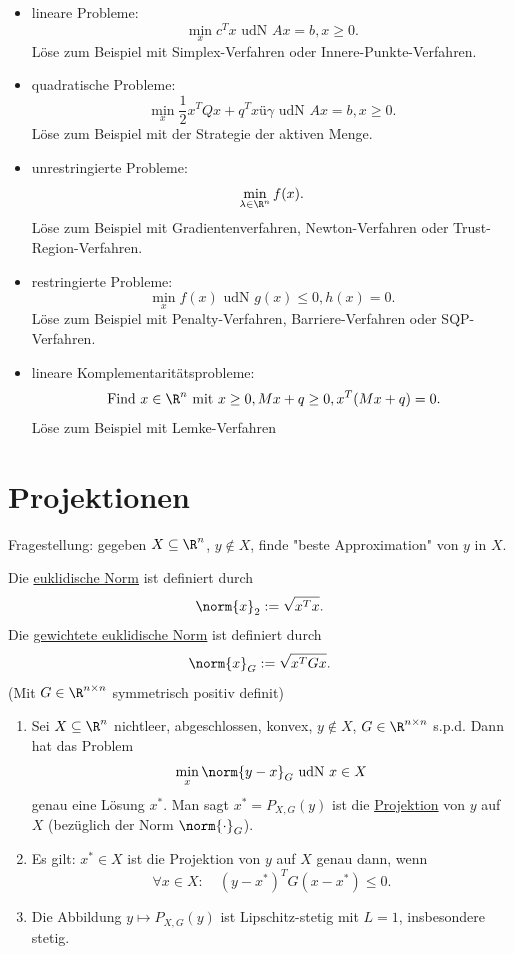\begin{itemize}
	\item lineare Probleme:
		\[
		\min\limits_{x}c^{T}x \text{ udN } Ax=b, x \geq 0
		.\] 
		Löse zum Beispiel mit Simplex-Verfahren oder Innere-Punkte-Verfahren.
	\item quadratische Probleme:
		\[
			\min\limits_{x}\frac{1}{2}x^{T}Qx + q^{T}x ü \gamma \text{ udN } Ax=b, x\geq 0
		.\] 
		Löse zum Beispiel mit der Strategie der aktiven Menge.
	\item unrestringierte Probleme:
		\[
			\min\limits_{\lambda \in \R^{n}}f(x)
		.\] 
		Löse zum Beispiel mit Gradientenverfahren, Newton-Verfahren oder Trust-Region-Verfahren.
	\item restringierte Probleme:
		\[
			\min\limits_{x} f(x) \text{ udN } g(x) \leq 0 , h(x) = 0
		.\] 
		Löse zum Beispiel mit Penalty-Verfahren, Barriere-Verfahren oder SQP-Verfahren.
	\item lineare Komplementaritätsprobleme:
		\[
			\text{ Find }x \in \R^{n} \text{ mit } x \geq 0, Mx+q \geq 0, x^{T}(Mx+q) = 0
		.\] 
		Löse zum Beispiel mit Lemke-Verfahren
\end{itemize}

\section{Projektionen}%
\label{sec:Projektionen}

Fragestellung: gegeben $X \subseteq \R^{n}$, $y \not \in X$, finde "beste Approximation" von $y$ in $X$.

\begin{definition}
\label{thm:euklidischenorm}
	Die \underline{euklidische Norm} ist definiert durch
	\[
	\norm{x} _{2}:= \sqrt{x^{T}x}  
	.\] 
	Die \underline{gewichtete euklidische Norm} ist definiert durch
	\[
	\norm{x} _{G}:= \sqrt{x^{T}Gx} 
	.\] 
	(Mit $G \in \R^{n \times n}$ symmetrisch positiv definit)
\end{definition}

\begin{satz}
\label{thm:projektionssatz}
	\begin{enumerate}[label=(\alph{enumi})]
		\item Sei $X \subseteq \R^{n}$ nichtleer, abgeschlossen, konvex, $y \not \in X$, $G \in \R^{n \times n}$ s.p.d. Dann hat das Problem 
		\[
		\min\limits_{x}\norm{y-x} _{G} \text{ udN } x \in X
		\] 
		genau eine Lösung ${x}^{*}$. Man sagt ${x}^{*}=P_{X,G}(y)$ ist die \underline{Projektion} von $y$ auf $X$ (bezüglich der Norm $\norm{\cdot} _{G}$).
		\item Es gilt: ${x}^{*} \in X$ ist die Projektion von $y$ auf $X$ genau dann, wenn
			\[
				\forall x \in X: \quad (y-{x}^{*})^{T}G(x-{x}^{*}) \leq 0
			.\] 
		\item Die Abbildung $y \mapsto P_{X,G}(y)$ ist Lipschitz-stetig mit $L = 1$, insbesondere stetig.
	\end{enumerate}
\end{satz}

